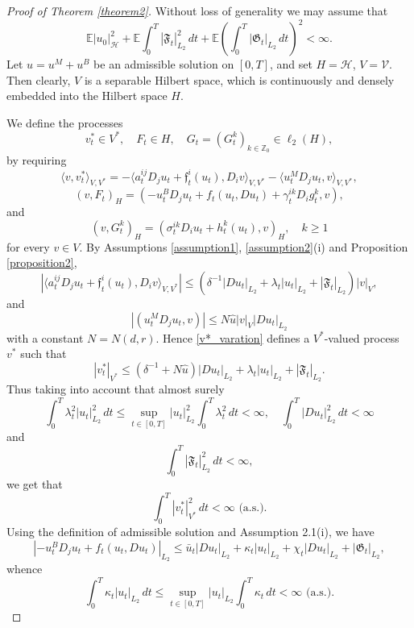 \documentclass[11pt,reqno]{amsart}
\theoremstyle{definition}
\theoremstyle{remark}
\newcommand\bZ{\mathbb{Z}}
\newcommand\frf{\mathfrak{f}}
\newcommand\frF{\mathfrak{F}}
\newcommand\frG{\mathfrak{G}}
\newcommand\cH{\mathcal{H}}
\newcommand\cV{\mathcal{V}}
\newcommand{\<}{\langle}
\renewcommand{\>}{\rangle}
\newcommand{\E}{\mathbb{E}}
\begin{document}
\begin{proof}[Proof of Theorem \ref{theorem2}]
Without loss of generality we may assume that 
$$
\E|u_0|_{\mathcal H}^2
+\E\int_0^T|\frF_t|_{ L_2}^2\,dt
+\E\left(\int_0^T|\frG_t|_{L_2}\,dt\right)^2<\infty. 
$$
Let $u=u^M +u^B$ be an admissible solution on $[0,T]$, and 
set $H=\cH$, $V=\cV$. Then clearly, $V$ is a separable Hilbert space,  
which is continuously and densely embedded into the Hilbert 
space $H$. 

We define the processes
$$
v_t^\ast\in V^\ast,
\quad
F_t\in H,
\quad
G_t=(G_t^k)_{k\in\bZ_0}\in \ell_2(H),
$$
by requiring 
\begin{equation} 
                                            \label{v*_varation}
\langle v,v_t^\ast\rangle_{V,V^*}
= -\langle a_t^{ij}D_j u_t+\frf_t^i(u_t),D_i v\rangle_{V,V^*}
-\langle u_t^MD_j u_t,v\rangle_{V,V^*} ,
\end{equation}
\begin{equation*}
(v,F_t)_H
=
(-u_t^BD_j u_t+f_t(u_t,Du_t)+\gamma_t^{ik}D_i g_t^k,v),
\end{equation*}
and
$$
(v,G_t^k)_H=(\sigma_t^{ik}D_i u_t+h_t^k(u_t),v)_H,
\quad k\ge1
$$
for every $v\in V$. 
By Assumptions \ref{assumption1}, \ref{assumption2}(i) and 
Proposition \ref{proposition2},
$$
|\langle a_t^{ij}D_j u_t+\frf_t^i(u_t),D_i v\rangle _{V,V^*}|
\leq
(\delta^{-1}|Du_t|_{L_2}+\lambda_t|u_t|_{L_2}
+|\mathfrak{ F}_t|_{L_2})|v|_V,
$$
and
$$
|(u_t^MD_j u_t,v)|
\leq N\hat u|v|_{V}|Du_t|_{L_2}
$$
with a constant $N=N(d,r)$.  
Hence \eqref{v*_varation} defines a $V^{\ast}$-valued process $v^{\ast}$ 
such that 
$$
|v^{\ast}_t|_{V^{\ast}}
\leq (\delta^{-1}+N\hat u)|Du_t|_{L_2}+\lambda_t |u_t|_{L_2}
+|\mathfrak{ F}_t|_{L_2}.
$$
Thus taking into account that almost surely 
$$
\int_0^T \lambda_t^2|u_t|_{L_2}^2\,dt
\leq
\sup_{t\in[0,T]}|u_t|_{L_2}^2\int_0^T \lambda_t^2\,dt<\infty,
\quad \int_0^T|Du_t|^2_{L_2}\,dt<\infty
$$
and 
$$
\int_0^T|\frF_t|^2_{L_2}\,dt<\infty, 
$$
we get that 
\begin{equation}
                                                                  \label{Q_def}
\int_0^T |v_t^\ast|_{V^\ast}^2\,dt<\infty\,\,\text{(a.s.).}
\end{equation} 
Using the definition of admissible solution and Assumption 2.1(i),
we have 
$$
|-u_t^BD_j u_t+f_t(u_t,Du_t)|_{L_2}
\leq
\bar u_t|Du_t|_{L_2}+\kappa_t|u_t|_{L_2}+\chi_t|Du_t|_{L_2}
+|\mathfrak G_t|_{L_2},
$$
whence
\begin{equation*}
\int_0^T \kappa_t|u_t|_{L_2}\,dt
\le
\sup_{t\in[0,T]}|u_t|_{L_2}
\int_0^T \kappa_t\,dt<\infty\,\,\text{(a.s.)}.

\end{equation*}
\end{proof}
\end{document}
